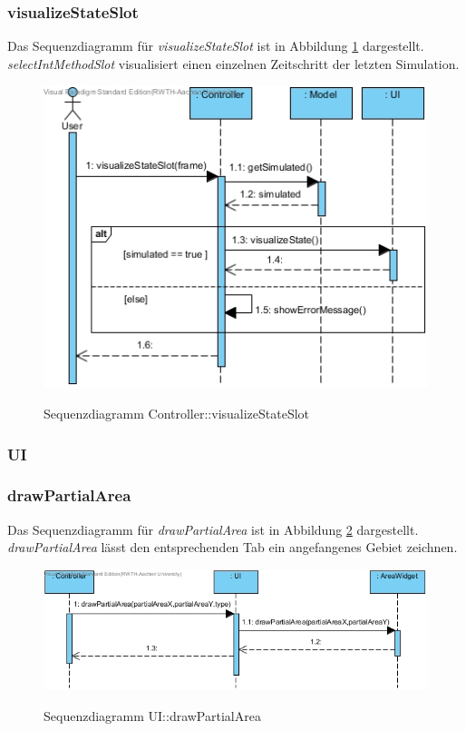 \subsubsection*{visualizeStateSlot}

Das Sequenzdiagramm für \emph{visualizeStateSlot} ist in Abbildung \ref{Sequenzdiagramm Controller::visualizeStateSlot} dargestellt. \emph{selectIntMethodSlot} visualisiert einen einzelnen Zeitschritt der letzten Simulation.

\begin{figure}[H]
	\centering
	\includegraphics[scale=.75]{Bilder/Controller__visualizeStateSlot().jpg}\\
	\caption{Sequenzdiagramm Controller::visualizeStateSlot}
	\label{Sequenzdiagramm Controller::visualizeStateSlot}
\end{figure}

\subsubsection{UI}

\subsubsection*{drawPartialArea}

Das Sequenzdiagramm für \emph{drawPartialArea} ist in Abbildung \ref{Sequenzdiagramm UI::drawPartialArea} dargestellt. \emph{drawPartialArea} lässt den entsprechenden Tab ein angefangenes Gebiet zeichnen.

\begin{figure}[H]
	\centering
	\includegraphics[scale=.75]{Bilder/UI__drawPartialArea().jpg}\\
	\caption{Sequenzdiagramm UI::drawPartialArea}
	\label{Sequenzdiagramm UI::drawPartialArea}
\end{figure}
\newpage
